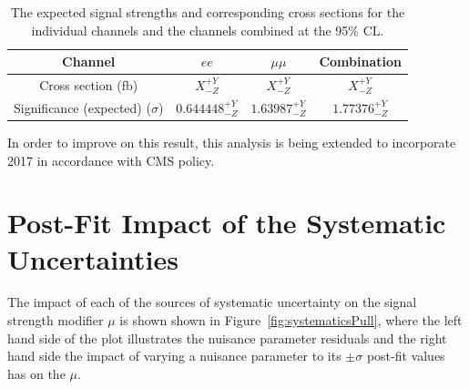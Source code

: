\begin{table}[!h]
   \centering
   \caption{The expected signal strengths and corresponding cross sections for
   the individual channels and the channels combined at the 95\% CL.}
   \begin{tabular}{cccc}
       \hline
       Channel & $ee$ & $\mu\mu$ & \textbf{Combination} \\
        \hline
       Cross section (fb) & $X_{-Z}^{+Y}$ & $X_{-Z}^{+Y}$ & $X_{-Z}^{+Y}$ \\
       Significance (expected) ($\sigma$) & $0.644448_{-Z}^{+Y}$ & $1.63987_{-Z}^{+Y}$ & $1.77376_{-Z}^{+Y}$ \\
    \end{tabular}
   \label{tab:shapetxs}
\end{table}

In order to improve on this result, this analysis is being extended to incorporate 2017 in accordance with CMS policy.

\section{Post-Fit Impact of the Systematic Uncertainties}\label{sec:uncertainitiesImpact}
The impact of each of the sources of systematic uncertainty on the signal strength modifier $\mu$ is shown shown in Figure~\ref{fig:systematicsPull}, where the left hand side of the plot illustrates the nuisance parameter residuals and the right hand side the impact of varying a nuisance parameter to its $\pm \sigma$ post-fit values has on the $\mu$.

%

%

%
%
%
% 
% 
%

